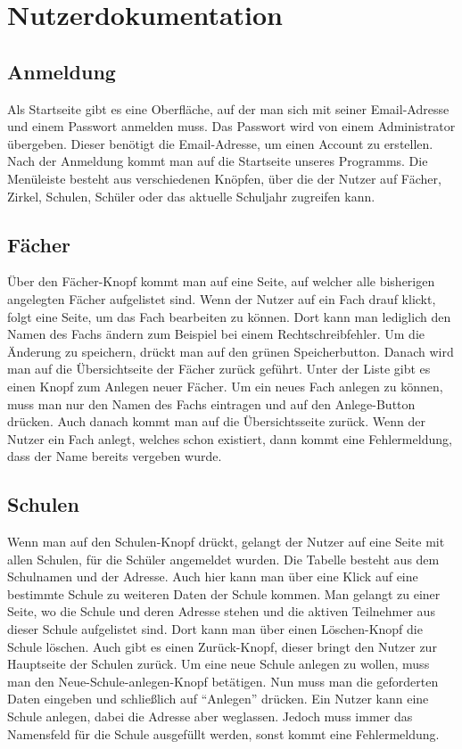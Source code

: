 \section{Nutzerdokumentation}
\subsection{Anmeldung}
Als Startseite gibt es eine Oberfläche, auf der man sich mit seiner Email-Adresse und einem Passwort anmelden muss. Das Passwort wird von einem Administrator übergeben. Dieser benötigt die Email-Adresse, um einen Account zu erstellen. Nach der Anmeldung kommt man auf die Startseite unseres Programms. Die Menüleiste besteht aus verschiedenen Knöpfen, über die der Nutzer auf Fächer, Zirkel, Schulen, Schüler oder das aktuelle Schuljahr zugreifen kann.

\subsection{Fächer}
Über den Fächer-Knopf kommt man auf eine Seite, auf welcher alle bisherigen angelegten Fächer aufgelistet sind. Wenn der Nutzer auf ein Fach drauf klickt, folgt eine Seite, um das Fach bearbeiten zu können. Dort kann man lediglich den Namen des Fachs ändern zum Beispiel bei einem Rechtschreibfehler. Um die Änderung zu speichern, drückt man auf den grünen Speicherbutton. Danach wird man auf die Übersichtseite der Fächer zurück geführt. Unter der Liste gibt es einen Knopf zum Anlegen neuer Fächer. Um ein neues Fach anlegen zu können, muss man nur den Namen des Fachs eintragen und auf den Anlege-Button drücken. Auch danach kommt man auf die Übersichtsseite zurück. Wenn der Nutzer ein Fach anlegt, welches schon existiert, dann kommt eine Fehlermeldung, dass der Name bereits vergeben wurde.

\subsection{Schulen}
Wenn man auf den Schulen-Knopf drückt, gelangt der Nutzer auf eine Seite mit allen Schulen, für die Schüler angemeldet wurden. Die Tabelle besteht aus dem Schulnamen und der Adresse. Auch hier kann man über eine Klick auf eine bestimmte Schule zu weiteren Daten der Schule kommen. Man gelangt zu einer Seite, wo die Schule und deren Adresse stehen und die aktiven Teilnehmer aus dieser Schule aufgelistet sind. Dort kann man über einen Löschen-Knopf die Schule löschen. Auch gibt es einen Zurück-Knopf, dieser bringt den Nutzer zur Hauptseite der Schulen zurück. Um eine neue Schule anlegen zu wollen, muss man den Neue-Schule-anlegen-Knopf betätigen. Nun muss man die geforderten Daten eingeben und schließlich auf "`Anlegen"' drücken. Ein Nutzer kann eine Schule anlegen, dabei die Adresse aber weglassen. Jedoch muss immer das Namensfeld für die Schule ausgefüllt werden, sonst kommt eine Fehlermeldung.

